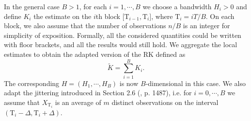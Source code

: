 \documentclass[11pt]{article}
\numberwithin{equation}{section}
\newcommand{\Tau}{\mathrm{T}}
\theoremstyle{plain}
\theoremstyle{remark}
\begin{document}
\smallskip
In the general case $B >1$, for each $i =1,\cdots,B$ we choose a bandwidth $H_i >0$ and define $K_i$ the estimate on the $i$th block $\big[ \Tau_{i-1}, \Tau_i \big]$, where $\Tau_{i} = iT/B$. On each block, we also assume that the number of observations $n/B$ is an integer for simplicity of exposition. Formally, all the considered quantities could be written with floor brackets, and all the results would still hold. We aggregate the local estimates to obtain the adapted version of the RK defined as 
$$\tilde{K} = \sum_{i=1}^{B} K_i.$$ 
The corresponding $H = (H_1,\cdots,H_B)$ is now $B$-dimensional in this case. We also adapt the jittering introduced in Section 2.6 (\cite{barndorff2008designing}, p. 1487), i.e. for $i=0, \cdots, B$ we assume that $X_{\Tau_{i}}$ is an average of $m$ distinct observations on the interval $(\Tau_i - \Delta, \Tau_i + \Delta)$. 
\end{document}
